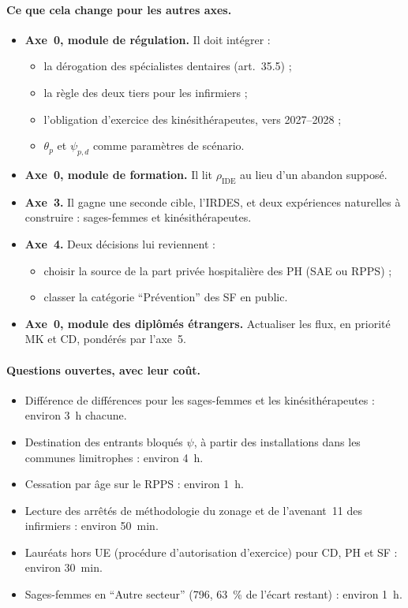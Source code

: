 \documentclass[11pt]{article}
\begin{document}
\paragraph{Ce que cela change pour les autres axes.}
\begin{itemize}
\item \textbf{Axe~0, module de régulation.} Il doit intégrer :
  \begin{itemize}
  \item la dérogation des spécialistes dentaires (art.~35.5) ;
  \item la règle des deux tiers pour les infirmiers ;
  \item l'obligation d'exercice des kinésithérapeutes, vers 2027--2028 ;
  \item $\theta_p$ et $\psi_{p,d}$ comme paramètres de scénario.
  \end{itemize}
\item \textbf{Axe~0, module de formation.} Il lit $\rho_{\mathrm{IDE}}$ au
  lieu d'un abandon supposé.
\item \textbf{Axe~3.} Il gagne une seconde cible, l'IRDES, et deux
  expériences naturelles à construire : sages-femmes et kinésithérapeutes.
\item \textbf{Axe~4.} Deux décisions lui reviennent :
  \begin{itemize}
  \item choisir la source de la part privée hospitalière des PH (SAE ou
    RPPS) ;
  \item classer la catégorie \enquote{Prévention} des SF en public.
  \end{itemize}
\item \textbf{Axe~0, module des diplômés étrangers.} Actualiser les flux,
  en priorité MK et CD, pondérés par l'axe~5.
\end{itemize}

\paragraph{Questions ouvertes, avec leur coût.}
\begin{itemize}
\item Différence de différences pour les sages-femmes et les
  kinésithérapeutes : environ 3~h chacune.
\item Destination des entrants bloqués $\psi$, à partir des installations
  dans les communes limitrophes : environ 4~h.
\item Cessation par âge sur le RPPS : environ 1~h.
\item Lecture des arrêtés de méthodologie du zonage et de l'avenant~11 des
  infirmiers : environ 50~min.
\item Lauréats hors UE (procédure d'autorisation d'exercice) pour CD, PH
  et SF : environ 30~min.
\item Sages-femmes en \enquote{Autre secteur} (796, 63~\% de l'écart
  restant) : environ 1~h.
\end{itemize}
\end{document}
